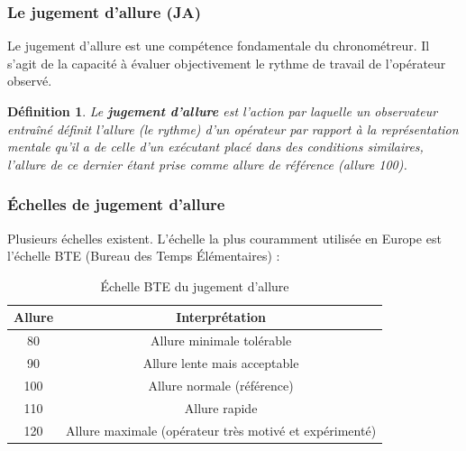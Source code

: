 \documentclass[a4paper,12pt]{article}
\newtheorem{definition}{Définition}[section]
\begin{document}
\subsubsection{Le jugement d'allure (JA)}

Le jugement d'allure est une compétence fondamentale du chronométreur. Il s'agit de la capacité à évaluer objectivement le rythme de travail de l'opérateur observé.

\begin{definition}
Le \textbf{jugement d'allure} est l'action par laquelle un observateur entraîné définit l'allure (le rythme) d'un opérateur par rapport à la représentation mentale qu'il a de celle d'un exécutant placé dans des conditions similaires, l'allure de ce dernier étant prise comme allure de référence (allure 100).
\end{definition}

\subsubsection{Échelles de jugement d'allure}

Plusieurs échelles existent. L'échelle la plus couramment utilisée en Europe est l'échelle BTE (Bureau des Temps Élémentaires) :

\begin{table}[ht]
\centering
\begin{tabular}{|c|c|}
\hline
\textbf{Allure} & \textbf{Interprétation} \\
\hline
80 & Allure minimale tolérable \\
90 & Allure lente mais acceptable \\
100 & Allure normale (référence) \\
110 & Allure rapide \\
120 & Allure maximale (opérateur très motivé et expérimenté) \\
\hline
\end{tabular}
\caption{Échelle BTE du jugement d'allure}
\end{table}

\begin{center}
\end{center}
\end{document}
